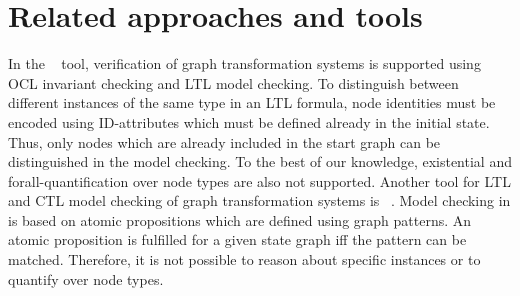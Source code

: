 
\section{Related approaches and tools}
\label{sec:relatedwork}

In the \moment~\cite{Boronat2009} tool, verification of graph transformation systems
is supported using OCL invariant checking and LTL model checking. To distinguish between different instances of the same type in an LTL formula, node identities must be encoded using ID-attributes which must be defined already in the initial state. Thus, only nodes which are already included in the start graph can be distinguished in the model checking. To the best of our knowledge, existential and forall-quantification over node types are also not supported.
%
Another tool for LTL and CTL model checking of graph transformation systems is \groove~\cite{rensink06}. Model checking in \groove is based on atomic propositions which are defined using graph patterns. An atomic proposition is fulfilled for a given state graph iff the pattern can be matched. Therefore, it is not possible to reason about specific instances or to quantify over node types.

% 
% 




